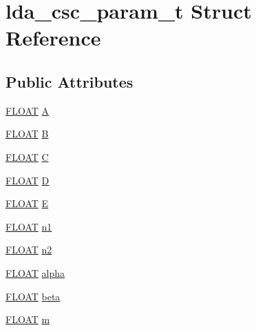 \hypertarget{structlda__csc__param__t}{\section{lda\-\_\-csc\-\_\-param\-\_\-t Struct Reference}
\label{structlda__csc__param__t}
}
\subsection*{Public Attributes}
\begin{DoxyCompactItemize}
\item 
\hyperlink{src_2xc__config_8h_ae8690abbffa85934d64d545920e2b108}{F\-L\-O\-A\-T} \hyperlink{structlda__csc__param__t_a824d8e3f5f92c9a46facd29b42f4b759}{A}
\item 
\hyperlink{src_2xc__config_8h_ae8690abbffa85934d64d545920e2b108}{F\-L\-O\-A\-T} \hyperlink{structlda__csc__param__t_a6020a5f5a91014866dc264a5ab44dd80}{B}
\item 
\hyperlink{src_2xc__config_8h_ae8690abbffa85934d64d545920e2b108}{F\-L\-O\-A\-T} \hyperlink{structlda__csc__param__t_ac2d99567d9f66f8e4a063e5f2afa7906}{C}
\item 
\hyperlink{src_2xc__config_8h_ae8690abbffa85934d64d545920e2b108}{F\-L\-O\-A\-T} \hyperlink{structlda__csc__param__t_acb1e42a751c6826b8ff293eba2ef4de2}{D}
\item 
\hyperlink{src_2xc__config_8h_ae8690abbffa85934d64d545920e2b108}{F\-L\-O\-A\-T} \hyperlink{structlda__csc__param__t_aaad3c9ba51808ce7c311c18b8687ccc4}{E}
\item 
\hyperlink{src_2xc__config_8h_ae8690abbffa85934d64d545920e2b108}{F\-L\-O\-A\-T} \hyperlink{structlda__csc__param__t_a8510145d8bf17aaf33ef3011621a810f}{n1}
\item 
\hyperlink{src_2xc__config_8h_ae8690abbffa85934d64d545920e2b108}{F\-L\-O\-A\-T} \hyperlink{structlda__csc__param__t_a14e2e124e9f648dac6e9fe0f876025c3}{n2}
\item 
\hyperlink{src_2xc__config_8h_ae8690abbffa85934d64d545920e2b108}{F\-L\-O\-A\-T} \hyperlink{structlda__csc__param__t_ae3e55b8053c54fcc37933beee8b2fd73}{alpha}
\item 
\hyperlink{src_2xc__config_8h_ae8690abbffa85934d64d545920e2b108}{F\-L\-O\-A\-T} \hyperlink{structlda__csc__param__t_aa5b6c3192e37f2b55797f1106ce4ed29}{beta}
\item 
\hyperlink{src_2xc__config_8h_ae8690abbffa85934d64d545920e2b108}{F\-L\-O\-A\-T} \hyperlink{structlda__csc__param__t_ac87c960a9e6dd84ff206a3c1411b8866}{m}
\end{DoxyCompactItemize}


